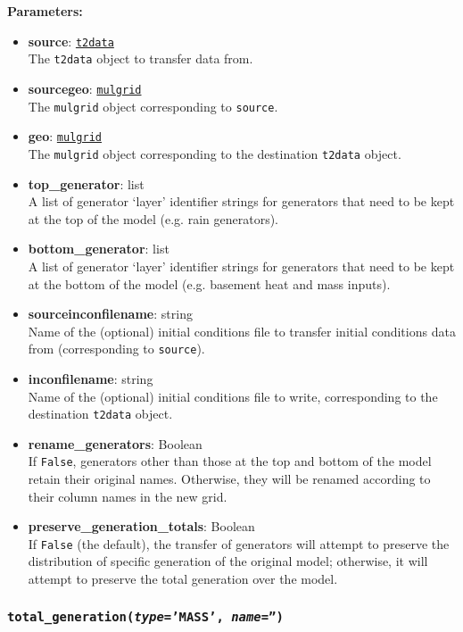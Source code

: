 \textbf{Parameters:}
\begin{itemize}
\item \textbf{source}: \hyperref[datafiles]{\texttt{t2data}}\\
  The \texttt{t2data} object to transfer data from.
\item \textbf{sourcegeo}: \hyperref[mulgrids]{\texttt{mulgrid}}\\
  The \texttt{mulgrid} object corresponding to \texttt{source}.
\item \textbf{geo}: \hyperref[mulgrids]{\texttt{mulgrid}}\\
  The \texttt{mulgrid} object corresponding to the destination \texttt{t2data} object.
\item \textbf{top\_generator}: list\\
  A list of generator `layer' identifier strings for generators that need to be kept at the top of the model (e.g. rain generators).
\item \textbf{bottom\_generator}: list\\
  A list of generator `layer' identifier strings for generators that need to be kept at the bottom of the model (e.g. basement heat and mass inputs).
\item \textbf{sourceinconfilename}: string\\
  Name of the (optional) initial conditions file to transfer initial conditions data from (corresponding to \texttt{source}).
\item \textbf{inconfilename}: string\\
  Name of the (optional) initial conditions file to write, corresponding to the destination \texttt{t2data} object.
\item \textbf{rename\_generators}: Boolean\\
  If \texttt{False}, generators other than those at the top and bottom of the model retain their original names.  Otherwise, they will be renamed according to their column names in the new grid.
\item \textbf{preserve\_generation\_totals}: Boolean\\
  If \texttt{False} (the default), the transfer of generators will attempt to preserve the distribution of specific generation of the original model; otherwise, it will attempt to preserve the total generation over the model.
\end{itemize}

\begin{snugshade}
\subsubsection{\texttt{total\_generation(\emph{type}='MASS', \emph{name}='')}}
\end{snugshade}
\label{sec:t2data:total_generation}

